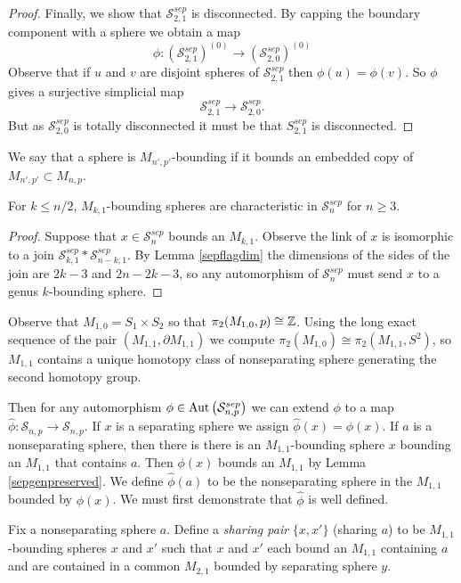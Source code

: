 \begin{proof}
Finally, we show that $\mathcal {S}^{sep}_{2,1}$
is disconnected.
By capping the boundary component with a sphere we obtain a map
$$
\phi: \left (\mathcal {S}^{sep}_{2,1} \right )^{(0)} \to \left (\mathcal {S}^{sep}_{2,0} \right )^{(0)}
$$
Observe that if $u$ and $v$ are disjoint spheres of $\mathcal {S}^{sep}_{2,1}$
then $\phi(u)=\phi(v)$.
So $\phi$ gives a surjective simplicial map
$$
\mathcal {S}^{sep}_{2,1}  \to \mathcal {S}^{sep}_{2,0}.
$$
But as $\mathcal {S}^{sep}_{2,0}$ is totally disconnected it must be that ${S}^{sep}_{2,1}$
is disconnected.
\end{proof}


\noindent
We say that a sphere is $M_{n',p'}$-bounding if it bounds an embedded copy of $M_{n',p'} \subset M_{n,p}$.

\begin{lemma}
  \label{sepgenpreserved}
For $k\leq n/2$,
$M_{k,1}$-bounding spheres are characteristic in $\mathcal {S}^{sep}_{n}$ for $n\geq 3$.
\end{lemma}
\begin{proof}
Suppose that $x \in \mathcal {S}^{sep}_{n}$ bounds
an $M_{k,1}$.
Observe the link of $x$ is isomorphic to
a join
$\mathcal S^{sep}_{k,1}  \ast \mathcal S^{sep}_{n-k,1}$.
By Lemma \ref{sepflagdim}
the dimensions of the sides of the join are $2k-3$ and $2n-2k-3$,
so any automorphism of $\mathcal {S}^{sep}_{n}$
must send $x$ to a genus $k$-bounding sphere.
\end{proof}


Observe that
$M_{1,0} = S_1 \times S_2$
so that $\pi_2(M_{1,0},p) \cong \mathbb{Z}$.
Using the long exact sequence of the pair
$(M_{1,1},\partial M_{1,1})$
we compute  $\pi_2(M_{1,0}) \cong \pi_2 (M_{1,1}, S^2 )$,
so $M_{1,1}$
contains a unique homotopy class of nonseparating sphere
generating the second homotopy group.

Then for any automorphism $\phi \in \operatorname{Aut} \left (  \mathcal S^{sep}_{n,p}\right)$
we can extend $\phi$ to a map
$\hat \phi : \mathcal S_{n,p} \to \mathcal S_{n,p}$.
If $x$ is a separating sphere we assign $\hat \phi (x) = \phi(x)$.
If $a$ is a nonseparating sphere, then
there is there is an $M_{1,1}$-bounding sphere $x$
bounding an $M_{1,1}$ that contains $a$.
Then $\phi(x)$ bounds an $M_{1,1}$ by
Lemma \ref{sepgenpreserved}.
We define $\hat \phi(a)$ to be
the nonseparating sphere in the $M_{1,1}$ bounded by $\phi(x)$.
We must first demonstrate that $\hat \phi$ is well defined.

Fix a nonseparating sphere $a$.
Define a \emph{sharing pair} $\{x,x'\}$ (sharing $a$) to be
$M_{1,1}$-bounding spheres $x$ and $x'$
such that $x$ and $x'$ each bound an $M_{1,1}$ containing $a$
and are contained in a common $M_{2,1}$ bounded by separating sphere $y$.

